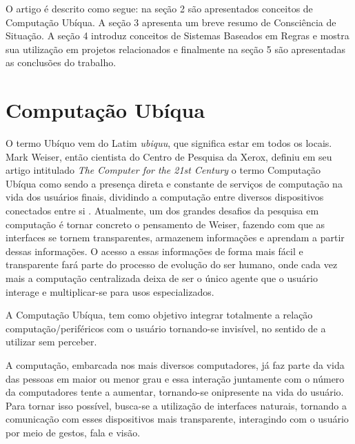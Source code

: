 \documentclass[12pt,a4paper,compsoc]{IEEEtran}
\begin{document}
  O artigo é descrito como segue: na seção 2 são apresentados conceitos de Computação Ubíqua. A
  seção 3 apresenta um breve resumo de Consciência de Situação. A seção 4 introduz conceitos de
  Sistemas Baseados em Regras e mostra sua utilização em projetos relacionados e finalmente na
  seção 5 são apresentadas as conclusões do trabalho.


\section{Computação Ubíqua}

  O termo Ubíquo vem do Latim \textit{ubiquu}, que significa estar em todos os locais. Mark Weiser,
  então cientista do Centro de Pesquisa da Xerox, definiu em seu artigo intitulado  \textit{The
  Computer for the 21st Century} o termo Computação Ubíqua como sendo a presença direta e constante
  de serviços de computação na vida dos usuários finais, dividindo a computação entre diversos
  dispositivos conectados entre si \cite{weiser1991}. Atualmente, um dos grandes desafios da
  pesquisa em computação é tornar concreto o pensamento de Weiser, fazendo com que as interfaces se
  tornem transparentes, armazenem informações e aprendam a partir dessas informações. O acesso a
  essas informações de forma mais fácil e transparente fará parte do processo de evolução do ser
  humano, onde cada vez mais a computação centralizada deixa de ser o único agente que o usuário
  interage e multiplicar-se para usos especializados. 
  
  A Computação Ubíqua, tem como  objetivo integrar totalmente a relação computação/periféricos com
  o usuário tornando-se invisível, no sentido de a utilizar sem perceber.
  
  A computação, embarcada nos mais diversos computadores, já faz parte da vida das pessoas em maior
  ou menor grau e essa interação juntamente com o número da computadores tente a aumentar,
  tornando-se onipresente na vida do usuário. Para tornar isso possível, busca-se a utilização de
  interfaces naturais, tornando a comunicação com esses dispositivos mais transparente, interagindo
  com o usuário por meio de gestos, fala e visão.
  
\end{document}
